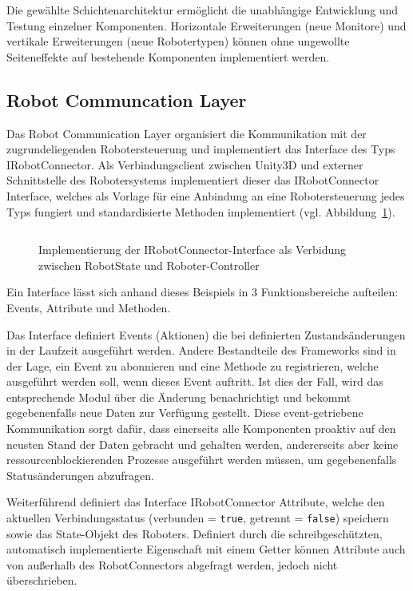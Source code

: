 Die gewählte Schichtenarchitektur ermöglicht die unabhängige Entwicklung und
Testung einzelner Komponenten. Horizontale Erweiterungen (neue Monitore) und
vertikale Erweiterungen (neue Robotertypen) können ohne ungewollte
Seiteneffekte auf
bestehende Komponenten implementiert werden.

\subsection{Robot Communcation Layer}
Das Robot Communication Layer organisiert die Kommunikation mit der
zugrundeliegenden Robotersteuerung und
implementiert das Interface des Typs IRobotConnector. Als Verbindungsclient
zwischen Unity3D und externer Schnittstelle des Robotersystems implementiert
dieser das IRobotConnector Interface, welches als Vorlage für eine Anbindung an
eine Robotersteuerung jedes Typs fungiert und standardisierte Methoden
implementiert (vgl. Abbildung~\ref{figure:irobotconnector}).

\begin{figure}[H]
  \inputminted[fontsize=\footnotesize]{csharp}{code-snippets/IRobotConnector.cs}
  \caption{Implementierung der IRobotConnector-Interface als Verbidung zwischen
  RobotState und Roboter-Controller}
  \label{figure:irobotconnector}
\end{figure}

Ein Interface lässt sich anhand dieses Beispiels in 3
Funktionsbereiche aufteilen: Events, Attribute und Methoden.

Das Interface definiert Events (Aktionen) die bei
definierten Zustandsänderungen
in der Laufzeit ausgeführt werden. Andere Bestandteile des Frameworks
sind in der
Lage, ein Event zu abonnieren und eine Methode zu registrieren,
welche ausgeführt
werden soll, wenn dieses Event auftritt. Ist dies der Fall, wird das
entsprechende Modul über die Änderung benachrichtigt und bekommt gegebenenfalls
neue Daten zur Verfügung gestellt. Diese event-getriebene Kommunikation sorgt
dafür, dass einerseits alle Komponenten proaktiv auf den neusten
Stand der Daten gebracht
und gehalten werden, andererseits aber keine ressourcenblockierenden Prozesse
ausgeführt werden müssen, um gegebenenfalls Statusänderungen abzufragen.

Weiterführend definiert das Interface IRobotConnector
Attribute, welche den
aktuellen Verbindungsstatus (verbunden = \texttt{true}, getrennt =
\texttt{false}) speichern sowie das
State-Objekt des Roboters. Definiert durch die schreibgeschützten, automatisch
implementierte Eigenschaft mit einem Getter können Attribute
auch von außerhalb des RobotConnectors abgefragt werden, jedoch nicht
überschrieben.

